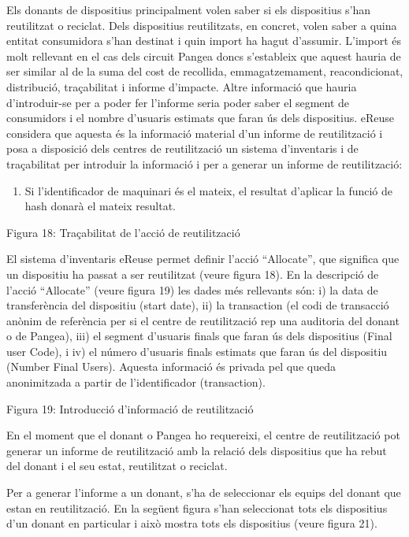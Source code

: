\documentclass[
]{book}
\providecommand{\tightlist}{%
  \setlength{\itemsep}{0pt}\setlength{\parskip}{0pt}}
\begin{document}
Els donants de dispositius principalment volen saber si els dispositius s'han reutilitzat o reciclat. Dels dispositius reutilitzats, en concret, volen saber a quina entitat consumidora s'han destinat i quin import ha hagut d'assumir. L'import és molt rellevant en el cas dels circuit Pangea doncs s'estableix que aquest hauria de ser similar al de la suma del cost de recollida, emmagatzemament, reacondicionat, distribució, traçabilitat i informe d'impacte. Altre informació que hauria d'introduir-se per a poder fer l'informe seria poder saber el segment de consumidors i el nombre d'usuaris estimats que faran ús dels dispositius. eReuse considera que aquesta és la informació material d'un informe de reutilització i posa a disposició dels centres de reutilització un sistema d'inventaris i de traçabilitat per introduir la informació i per a generar un informe de reutilització:

\begin{enumerate}
\def\labelenumi{\arabic{enumi}.}
\setcounter{enumi}{10}
\tightlist
\item
  Si l'identificador de maquinari és el mateix, el resultat d'aplicar la funció de hash donarà el mateix resultat.
\end{enumerate}

Figura 18: Traçabilitat de l'acció de reutilització

El sistema d'inventaris eReuse permet definir l'acció ``Allocate'', que significa que un dispositiu ha passat a ser reutilitzat (veure figura 18). En la descripció de l'acció ``Allocate'' (veure figura 19) les dades més rellevants són: i) la data de transferència del dispositiu (start date), ii) la transaction (el codi de transacció anònim de referència per si el centre de reutilització rep una auditoria del donant o de Pangea), iii) el segment d'usuaris finals que faran ús dels dispositius (Final user Code), i iv) el número d'usuaris finals estimats que faran ús del dispositiu (Number Final Users). Aquesta informació és privada pel que queda anonimitzada a partir de l'identificador (transaction).

Figura 19: Introducció d'informació de reutilització

En el moment que el donant o Pangea ho requereixi, el centre de reutilització pot generar un informe de reutilització amb la relació dels dispositius que ha rebut del donant i el seu estat, reutilitzat o reciclat.

Per a generar l'informe a un donant, s'ha de seleccionar els equips del donant que estan en reutilització. En la següent figura s'han seleccionat tots els dispositius d'un donant en particular i això mostra tots els dispositius (veure figura 21).
\end{document}
